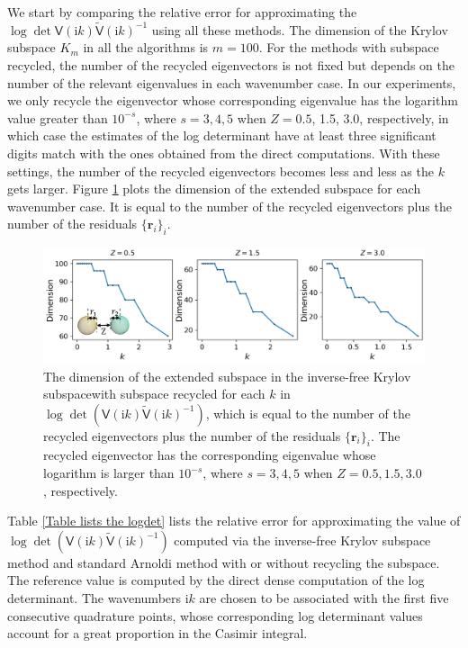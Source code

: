 We start by comparing the relative error for approximating the $\log\det\mathsf{V}(\mathrm{i}k)\tilde{\mathsf{V}}(\mathrm{i}k)^{-1}$ using all these methods. 
The dimension of the Krylov subspace $K_m$ in all the algorithms is $m = 100$. 
For the methods with subspace recycled, the number of the recycled eigenvectors is not fixed but depends on the number of the relevant eigenvalues in each wavenumber case. 
In our experiments, we only recycle the eigenvector whose corresponding eigenvalue has the logarithm value greater than $10^{-s}$, where $s = 3, 4, 5$ when $Z = 0.5$, 1.5, 3.0, respectively, in which case the estimates of the log determinant have at least three significant digits match with the ones obtained from the direct computations. With these settings, the number of the recycled
eigenvectors becomes less and less as the $k$ gets larger.  Figure \ref{Dimension_of_the_extended_subspace} plots the dimension of the extended subspace
for each wavenumber case. It is equal to the number of the recycled eigenvectors plus the number of the residuals $\{\mathbf{r}_{i}\}_{i}$.


\begin{figure}[H]
    \centering
    \includegraphics[width = \textwidth]{figures/Dimension_of_the_extended_subspace.png}
    \caption[Caption for LOF]{The dimension of the extended subspace in the inverse-free Krylov subspace\protect\footnotemark with subspace recycled for each $k$ in $\log\det(\mathsf{V}(\mathrm{i}k)\tilde{\mathsf{V}}(\mathrm{i}k)^{-1})$, which is equal to the number of the recycled 
    eigenvectors plus the number of the residuals $\{\mathbf{r}_{i}\}_{i}$. The recycled eigenvector has the corresponding eigenvalue whose logarithm
    is larger than $10^{-s}$, where $s = 3, 4, 5$ when $Z = 0.5, 1.5, 3.0$, respectively.}
    \label{Dimension_of_the_extended_subspace}
\end{figure}

Table \ref{Table lists the logdet} lists the relative error for approximating the value of $\log\det(\mathsf{V}(\mathrm{i}k)\tilde{\mathsf{V}}(\mathrm{i}k)^{-1})$ 
computed via the inverse-free Krylov subspace method and standard Arnoldi method with or without recycling the subspace. The reference value is computed by the 
direct dense computation of the log determinant. The wavenumbers $\mathrm{i}k$ are chosen to be associated with the first five consecutive quadrature points, 
whose corresponding log determinant values account for a great proportion in the Casimir integral. 

